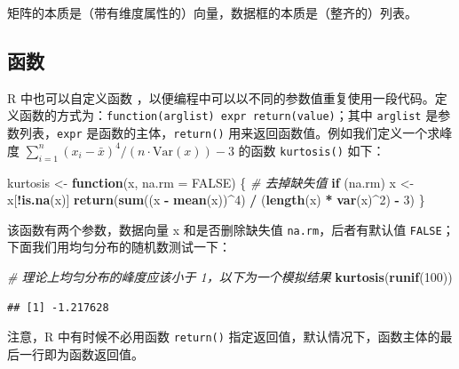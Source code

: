 \documentclass[
  b5paper,
  UTF8,twoside]{book}
\newenvironment{Shaded}{\begin{snugshade}}{\end{snugshade}}
\newcommand{\AttributeTok}[1]{\textcolor[rgb]{0.13,0.29,0.53}{#1}}
\newcommand{\CommentTok}[1]{\textcolor[rgb]{0.56,0.35,0.01}{\textit{#1}}}
\newcommand{\ConstantTok}[1]{\textcolor[rgb]{0.56,0.35,0.01}{#1}}
\newcommand{\ControlFlowTok}[1]{\textcolor[rgb]{0.13,0.29,0.53}{\textbf{#1}}}
\newcommand{\DecValTok}[1]{\textcolor[rgb]{0.00,0.00,0.81}{#1}}
\newcommand{\FunctionTok}[1]{\textcolor[rgb]{0.13,0.29,0.53}{\textbf{#1}}}
\newcommand{\NormalTok}[1]{#1}
\newcommand{\OtherTok}[1]{\textcolor[rgb]{0.56,0.35,0.01}{#1}}
\newcommand{\SpecialCharTok}[1]{\textcolor[rgb]{0.81,0.36,0.00}{\textbf{#1}}}
\begin{document}
矩阵的本质是（带有维度属性的）向量，数据框的本质是（整齐的）列表。

\subsection{函数}\label{ux51fdux6570}

R 中也可以自定义函数 ，以便编程中可以以不同的参数值重复使用一段代码。定义函数的方式为：\texttt{function(arglist)\ expr\ return(value)}；其中 \texttt{arglist} 是参数列表，\texttt{expr} 是函数的主体，\texttt{return()} 用来返回函数值。例如我们定义一个求峰度 \(\sum_{i=1}^{n}(x_{i}-\bar{x})^{4}/(n\cdot\mathrm{Var}(x))-3\) 的函数 \texttt{kurtosis()} 如下：

\begin{Shaded}
\begin{Highlighting}[]
\NormalTok{kurtosis }\OtherTok{\textless{}{-}} \ControlFlowTok{function}\NormalTok{(x, }\AttributeTok{na.rm =} \ConstantTok{FALSE}\NormalTok{) \{}
  \CommentTok{\# 去掉缺失值}
  \ControlFlowTok{if}\NormalTok{ (na.rm) x }\OtherTok{\textless{}{-}}\NormalTok{ x[}\SpecialCharTok{!}\FunctionTok{is.na}\NormalTok{(x)]}
  \FunctionTok{return}\NormalTok{(}\FunctionTok{sum}\NormalTok{((x }\SpecialCharTok{{-}} \FunctionTok{mean}\NormalTok{(x))}\SpecialCharTok{\^{}}\DecValTok{4}\NormalTok{) }\SpecialCharTok{/}\NormalTok{ (}\FunctionTok{length}\NormalTok{(x) }\SpecialCharTok{*} \FunctionTok{var}\NormalTok{(x)}\SpecialCharTok{\^{}}\DecValTok{2}\NormalTok{) }\SpecialCharTok{{-}} \DecValTok{3}\NormalTok{)}
\NormalTok{\}}
\end{Highlighting}
\end{Shaded}

该函数有两个参数，数据向量 x 和是否删除缺失值 \texttt{na.rm}，后者有默认值 \texttt{FALSE}；下面我们用均匀分布的随机数测试一下：

\begin{Shaded}
\begin{Highlighting}[]
\CommentTok{\# 理论上均匀分布的峰度应该小于 1，以下为一个模拟结果}
\FunctionTok{kurtosis}\NormalTok{(}\FunctionTok{runif}\NormalTok{(}\DecValTok{100}\NormalTok{))}
\end{Highlighting}
\end{Shaded}

\begin{verbatim}
## [1] -1.217628
\end{verbatim}

注意，R 中有时候不必用函数 \texttt{return()} 指定返回值，默认情况下，函数主体的最后一行即为函数返回值。
\end{document}

